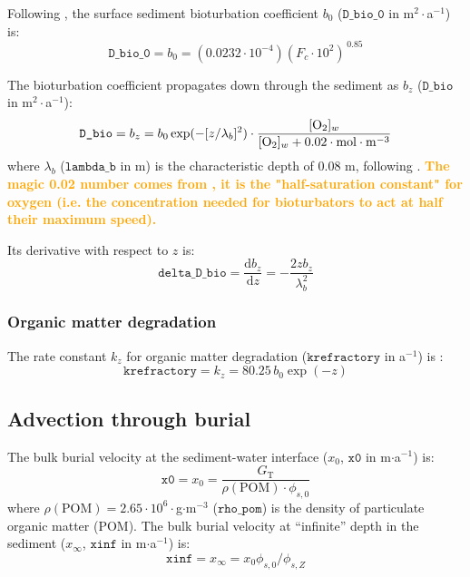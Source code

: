 \documentclass[a4paper]{article}
\newcommand{\D}[1]{\mathrm{d}#1}
\newcommand{\code}[1]{\texttt{#1}}
\newcommand{\molmmm}{\mathrm{mol}\cdot\mathrm{m}^{-3}}
\newcommand{\codenote}[1]{\textcolor{Orange}{\textbf{#1}}}
\begin{document}
Following \citet{archer_model_2002}, the surface sediment bioturbation coefficient $b_0$ ($\code{D\_bio\_0}$ in m$^2\cdot$a$^{-1}$) is:
\begin{equation}\label{D_bio_0}
\code{D\_bio\_0} = b_0 = (0.0232 \cdot 10^{-4}) (F_c \cdot 10^2)^{\,0.85}
\end{equation}

The bioturbation coefficient propagates down through the sediment as $b_z$ ($\code{D\_bio}$ in m$^2\cdot$a$^{-1}$):
\begin{equation}\label{B_z}
\code{D\_bio} = b_z = b_0 \exp(-[z/\lambda_b]^2) \cdot \frac{[\ce{O2}]_w}{[\ce{O2}]_w + 0.02 \cdot \molmmm}
\end{equation}
where $\lambda_b$ ($\code{lambda\_b}$ in m) is the characteristic depth of 0.08 m, following \citet{sayles_benthic_2001}.  \codenote{The magic 0.02 number comes from \citet{archer_model_2002}, it is the "half-saturation constant" for oxygen (i.e. the concentration needed for bioturbators to act at half their maximum speed).}

Its derivative with respect to $z$ is:
\begin{equation}
\code{delta\_D\_bio} = \frac{\D{b_z}}{\D{z}} = - \frac{2 z b_z}{\lambda_b^2}
\end{equation}


\subsubsection{Organic matter degradation}

The rate constant $k_z$ for organic matter degradation ($\code{krefractory}$ in a$^{-1}$) is \citep{archer_model_2002}:
\begin{equation}\label{k_poc_degradation}
\code{krefractory} = k_z = 80.25 \, b_0 \exp(-z)
\end{equation}


\subsection{Advection through burial}

The bulk burial velocity at the sediment-water interface ($x_0$, $\code{x0}$ in m$\cdot$a$^{-1}$) is:
\begin{equation}
\code{x0} = x_0 = \frac{G_\mathrm{T}}{\rho(\mathrm{POM}) \cdot \phi_{s, 0}}
\end{equation}
where $\rho(\mathrm{POM}) = 2.65\cdot10^6\cdot$g$\cdot$m$^{-3}$ ($\code{rho\_pom}$) is the density of particulate organic matter (POM).  The bulk burial velocity at ``infinite'' depth in the sediment ($x_\infty$, $\code{xinf}$ in m$\cdot$a$^{-1}$) is:
\begin{equation}
\code{xinf} = x_\infty = x_0 \phi_{s,0} / \phi_{s,Z}
\end{equation}
\end{document}
